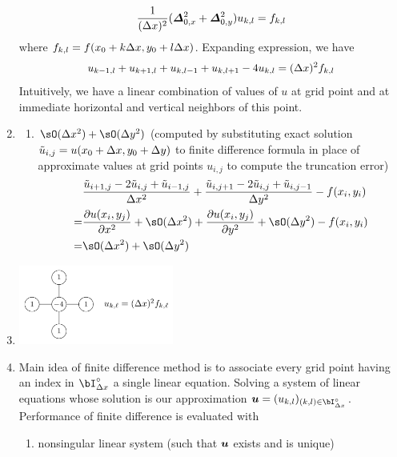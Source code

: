\documentclass[11pt]{article}
\begin{document}
\begin{enumerate}
    \[
        \frac{1}{(\Delta x)^2} (\boldsymbol{\varDelta}_{0,x}^2 + \boldsymbol{\varDelta}_{0, y}^2) u_{k,l} = f_{k,l}
    \]
    where $f_{k,l} = f(x_0 + k\Delta x, y_0 + l\Delta x)$. Expanding expression, we have
    \[
        u_{k-1,l} + u_{k+1, l} + u_{k, l-1} + u_{k, l+1} - 4u_{k,l} = (\Delta x)^2 f_{k,l}    
    \]
    Intuitively, we have a linear combination of values of $u$ at grid point and at immediate horizontal and vertical neighbors of this point.
    \item {}
    \begin{enumerate}
        \item {} $\sO(\Dx^2) + \sO(\Dy^2)$ (computed by substituting exact solution $\tilde{u}_{i,j} = u(x_0+\Delta x,y_0+\Delta y)$ to finite difference formula in place of approximate values at grid points $u_{i,j}$ to compute the truncation error)
        \begin{align*}
            &\frac{ \tu_{i+1,j} - 2\tu_{i,j} + \tu_{i-1,j} }{\Dx^2} + 
            \frac{ \tu_{i, j+1} -2\tu_{i,j} + \tu_{i,j-1} }{\Dy^2} - f(x_i, y_i) \\
            = &\frac{\partial u(x_i, y_j)}{\partial x^2} + \sO(\Dx^2) + 
            \frac{\partial u(x_i, y_j)}{\partial y^2} + \sO(\Dy^2) - f(x_i, y_i) \\
            = &\sO(\Dx^2) + \sO(\Dy^2)
        \end{align*}
    \end{enumerate}
    \item {} 
    \begin{center}
        \includegraphics[width=0.4\textwidth]{five_point_stencil}
    \end{center}
    \item {} Main idea of finite difference method is to associate every grid point having an index in $\bI_{\Dx}^{\circ}$ a single linear equation. Solving a system of linear equations whose solution is our approximation $\bu = (u_{k,l})_{(k,l)\in \bI_{\Dx}^{\circ}}$. Performance of finite difference is evaluated with 
    \begin{enumerate}
        \item nonsingular linear system (such that $\bm{u}$ exists and is unique)

\end{enumerate}
\end{enumerate}
\end{document}
